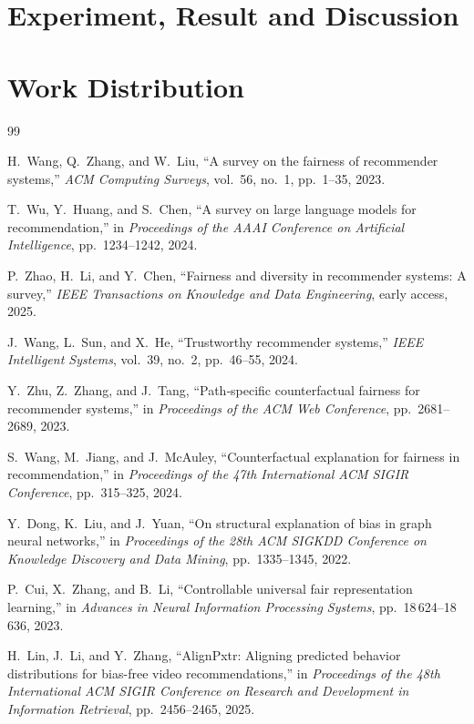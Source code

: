 \documentclass{article}
\begin{document}
\section{Experiment, Result and Discussion}
\label{sec:pagestyle}



\section{Work Distribution}
\label{sec:typestyle}


\vfill\pagebreak
\begin{thebibliography}{99}

H.~Wang, Q.~Zhang, and W.~Liu, “A survey on the fairness of recommender systems,”
  \emph{ACM Computing Surveys}, vol.~56, no.~1, pp.\ 1–35, 2023.

T.~Wu, Y.~Huang, and S.~Chen, “A survey on large language models for
  recommendation,” in \emph{Proceedings of the AAAI Conference on Artificial
  Intelligence}, pp.\ 1234–1242, 2024.

P.~Zhao, H.~Li, and Y.~Chen, “Fairness and diversity in recommender systems: A
  survey,” \emph{IEEE Transactions on Knowledge and Data Engineering}, early
  access, 2025.

J.~Wang, L.~Sun, and X.~He, “Trustworthy recommender systems,”
  \emph{IEEE Intelligent Systems}, vol.~39, no.~2, pp.\ 46–55, 2024.

Y.~Zhu, Z.~Zhang, and J.~Tang, “Path‐specific counterfactual fairness for
  recommender systems,” in \emph{Proceedings of the ACM Web Conference},
  pp.\ 2681–2689, 2023.

S.~Wang, M.~Jiang, and J.~McAuley, “Counterfactual explanation for fairness
  in recommendation,” in \emph{Proceedings of the 47th International ACM SIGIR
  Conference}, pp.\ 315–325, 2024.

Y.~Dong, K.~Liu, and J.~Yuan, “On structural explanation of bias in graph
  neural networks,” in \emph{Proceedings of the 28th ACM SIGKDD Conference on
  Knowledge Discovery and Data Mining}, pp.\ 1335–1345, 2022.

P.~Cui, X.~Zhang, and B.~Li, “Controllable universal fair representation
  learning,” in \emph{Advances in Neural Information Processing Systems},
  pp.\ 18\,624–18\,636, 2023.

H.~Lin, J.~Li, and Y.~Zhang,
 “AlignPxtr: Aligning predicted behavior distributions for bias-free video recommendations,”
 in \emph{Proceedings of the 48th International ACM SIGIR Conference on Research and Development in Information Retrieval},
 pp.\ 2456–2465, 2025.

\end{thebibliography}
\end{document}
